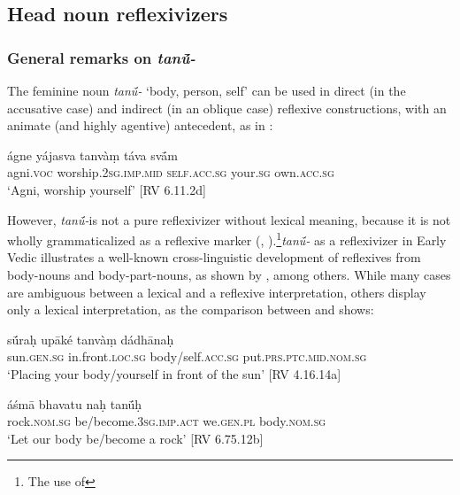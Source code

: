 \documentclass[output=paper]{langscibook}
\begin{document}
\subsection{Head noun reflexivizers}
\label{sec:Orqueda:2.2}

\subsubsection{General remarks on \textit{tan\'{ū}-} }
\label{sec:Orqueda:2.2.1}


{The feminine noun \textit{tan\'{ū}-} ‘body, person, self’ can be used in direct (in the accusative case) and indirect (in an oblique case) reflexive constructions, with an animate (and highly agentive) antecedent, as in :}

\ea%
    \label{ex:Orqueda:13}
\gll ágne  yájasva  tanvàṃ  táva  sv\'{ā}m\\
   agni.\textsc{voc}  worship.\textsc{2sg.imp.mid}  \textsc{self.acc.sg}  your.\textsc{sg}  own.\textsc{acc.sg}\\
\glt ‘Agni, worship yourself’ [RV 6.11.2d]
\z

However, \textit{tan\'{ū}-}is not a pure reflexivizer without lexical meaning, because it is not wholly grammaticalized as a reflexive marker (\citealt{Pinault2001}, \citealt{Orqueda2019}).\footnote{ The use of}{\textit{tan\'{ū}-} }{as a reflexivizer in Early Vedic illustrates a well-known cross-linguistic development of reflexives from body-nouns and body-part-nouns, as shown by \citet{Schladt2000}, among others.}{ While many cases are ambiguous between a lexical and a reflexive interpretation, others display only a lexical interpretation, as the comparison between  and  shows:}

\ea%
    \label{ex:Orqueda:14}
\ea
 \label{ex:Orqueda:14a}
\gll s\'{ū}raḥ  upāké  tanvàṃ  dádhānaḥ\\
      sun.\textsc{gen.sg}  in.front.\textsc{loc.sg}  body/self\textsc{.acc.sg}  put.\textsc{prs.ptc.mid.nom.sg}\\
\glt ‘Placing your body/yourself in front of the sun’ [RV 4.16.14a]

\ex
 \label{ex:Orqueda:14b}
\gll áśmā  bhavatu  naḥ  tan\'{ū}ḥ\\
    rock.\textsc{nom.sg}  be/become.\textsc{3sg.imp.act}  we.\textsc{gen.pl}  body.\textsc{nom.sg}\\
\glt ‘Let our body be/become a rock’ [RV 6.75.12b]
\z
\z
\end{document}
